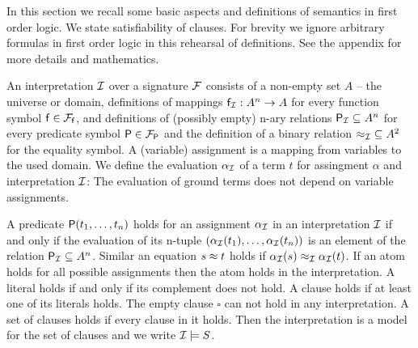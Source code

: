 In this section we recall some basic aspects and definitions of semantics in first order logic. 
We state satisfiability of clauses. For brevity we ignore arbitrary formulas in first order logic
in this rehearsal of definitions. See the appendix for more details and mathematics.

\begin{definition}\label{def:interpretation}
	An {\myem interpretation} ${\mathcal I}$ over a signature ${\mathcal F}$ consists of a
	non-empty set $A$ -- the {\myem universe} or {\myem domain},
	definitions of mappings ${\mathsf f}_{\mathcal I}: A^n\rightarrow A$ for every function symbol ${\mathsf f}\in{{\mathcal F}_{\mathsf f}}$, 
	and definitions of (possibly empty) n-ary relations 
	 ${{\mathsf P}_{\mathcal I}}\subseteq A^n$ for every predicate symbol ${\mathsf P}\in{{\mathcal F}_{\mathsf P}}$
	 and the definition of a binary relation ${\approx_{\mathcal I}}\subseteq A^2$ for the equality symbol.
	 A (variable) {\myem assignment} is a mapping from variables to the used domain.
	 We define the {\myem evaluation} $\alpha_{\mathcal I}$ of a term $t$ 
	 for assingment $\alpha$ and interpretation ${\mathcal I}$:
The evaluation of ground terms does not depend on variable assignments.
\end{definition}
\begin{definition}\label{def:model}
	A predicate ${\mathsf P}(t_1,\ldots,t_n)$ 
	{\myem holds} for an assignment $\alpha_{\mathcal I}$ 
	in an interpretation ${\mathcal I}$  
	if and only if the evaluation of its n-tuple $
	(\alpha_{\mathcal I}({t_1}),\ldots,\alpha_{\mathcal I}({t_n}))$
	is an element of the relation ${\mathsf P}_{\mathcal I}\subseteq A^n$.
	Similar an equation $s\approx t$ 
	holds if $\alpha_{\mathcal I}(s) \approx_{\mathcal I} \alpha_{\mathcal I}(t)$.
	If an atom holds for all possible assignments 
	then the atom holds in the interpretation. 
	A literal holds if and only if its complement does not hold.
	A clause holds if at least one of its literals holds.
	The empty clause $\square$ can not hold in any interpretation. 
	A set of clauses holds if every clause in it holds.
	Then the interpretation is a model for the set of clauses and 
	we write ${\mathcal I}\models S$. 
\end{definition}

